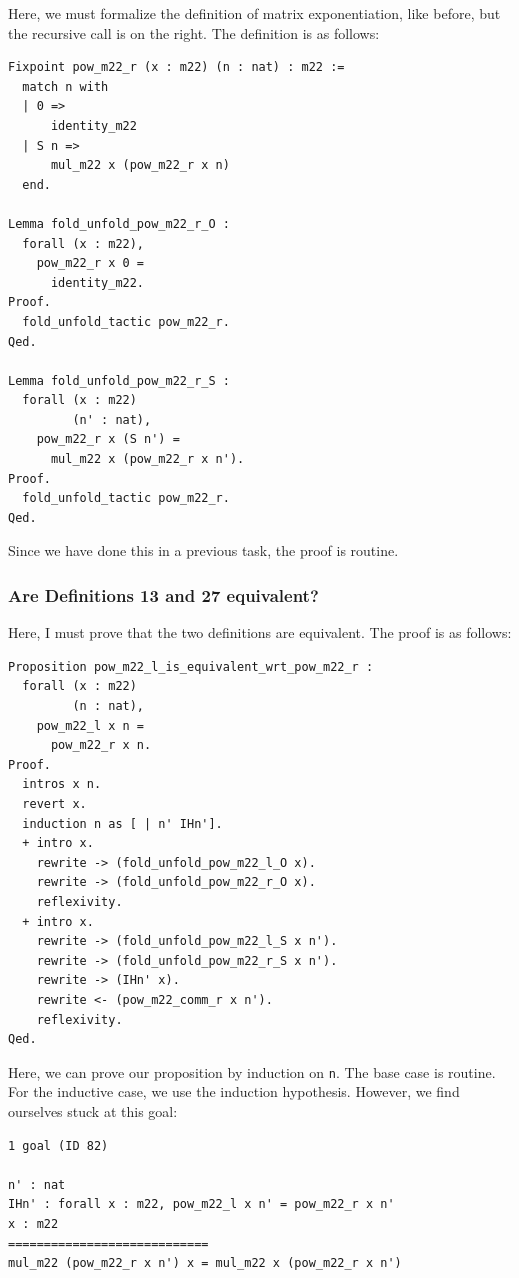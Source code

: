 \documentclass{article}
\begin{document}
Here, we must formalize the definition of matrix exponentiation, like before, but the recursive call is on the right. The definition is as follows:

\begin{lstlisting}
Fixpoint pow_m22_r (x : m22) (n : nat) : m22 :=
  match n with
  | 0 =>
      identity_m22
  | S n =>
      mul_m22 x (pow_m22_r x n)
  end.

Lemma fold_unfold_pow_m22_r_O :
  forall (x : m22),
    pow_m22_r x 0 =
      identity_m22.
Proof.
  fold_unfold_tactic pow_m22_r.
Qed.

Lemma fold_unfold_pow_m22_r_S :
  forall (x : m22)
         (n' : nat),
    pow_m22_r x (S n') =
      mul_m22 x (pow_m22_r x n').
Proof.
  fold_unfold_tactic pow_m22_r.
Qed.
\end{lstlisting}

Since we have done this in a previous task, the proof is routine.

\subsubsection{Are Definitions 13 and 27 equivalent?}

Here, I must prove that the two definitions are equivalent. The proof is as follows:

\begin{lstlisting}
Proposition pow_m22_l_is_equivalent_wrt_pow_m22_r :
  forall (x : m22)
         (n : nat),
    pow_m22_l x n =
      pow_m22_r x n.
Proof.
  intros x n.
  revert x.
  induction n as [ | n' IHn'].
  + intro x.
    rewrite -> (fold_unfold_pow_m22_l_O x).
    rewrite -> (fold_unfold_pow_m22_r_O x).
    reflexivity.
  + intro x.
    rewrite -> (fold_unfold_pow_m22_l_S x n').
    rewrite -> (fold_unfold_pow_m22_r_S x n').
    rewrite -> (IHn' x).
    rewrite <- (pow_m22_comm_r x n').
    reflexivity.
Qed.
\end{lstlisting}

Here, we can prove our proposition by induction on \texttt{n}. The base case is routine. For the inductive case, we use the induction hypothesis. However, we find ourselves stuck at this goal:

\begin{lstlisting}
1 goal (ID 82)

n' : nat
IHn' : forall x : m22, pow_m22_l x n' = pow_m22_r x n'
x : m22
============================
mul_m22 (pow_m22_r x n') x = mul_m22 x (pow_m22_r x n')
\end{lstlisting}
\end{document}
